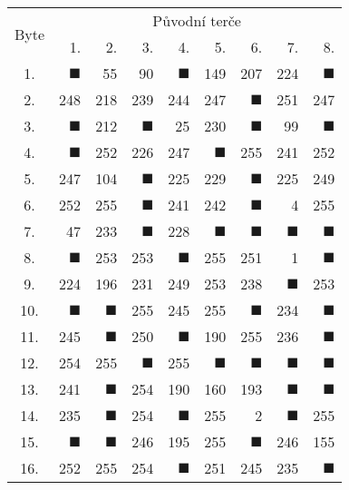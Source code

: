 \begin{tabular}{| c | r | r | r | r | r | r | r | r |}
	\hline
	\multirow{2}{*}{Byte} & \multicolumn{8}{c|}{Původní terče} \\
	\cline{2-9}
	~ & 1. & 2. & 3. & 4. & 5. & 6. & 7. & 8. \\
	\hline
	1.&$\blacksquare$&55&90&$\blacksquare$&149&207&224&$\blacksquare$\\
	\hline
	2.&248&218&239&244&247&$\blacksquare$&251&247\\
	\hline
	3.&$\blacksquare$&212&$\blacksquare$&25&230&$\blacksquare$&99&$\blacksquare$\\
	\hline
	4.&$\blacksquare$&252&226&247&$\blacksquare$&255&241&252\\
	\hline
	5.&247&104&$\blacksquare$&225&229&$\blacksquare$&225&249\\
	\hline
	6.&252&255&$\blacksquare$&241&242&$\blacksquare$&4&255\\
	\hline
	7.&47&233&$\blacksquare$&228&$\blacksquare$&$\blacksquare$&$\blacksquare$&$\blacksquare$\\
	\hline
	8.&$\blacksquare$&253&253&$\blacksquare$&255&251&1&$\blacksquare$\\
	\hline
	9.&224&196&231&249&253&238&$\blacksquare$&253\\
	\hline
	10.&$\blacksquare$&$\blacksquare$&255&245&255&$\blacksquare$&234&$\blacksquare$\\
	\hline
	11.&245&$\blacksquare$&250&$\blacksquare$&190&255&236&$\blacksquare$\\
	\hline
	12.&254&255&$\blacksquare$&255&$\blacksquare$&$\blacksquare$&$\blacksquare$&$\blacksquare$\\
	\hline
	13.&241&$\blacksquare$&254&190&160&193&$\blacksquare$&$\blacksquare$\\
	\hline
	14.&235&$\blacksquare$&254&$\blacksquare$&255&2&$\blacksquare$&255\\
	\hline
	15.&$\blacksquare$&$\blacksquare$&246&195&255&$\blacksquare$&246&155\\
	\hline
	16.&252&255&254&$\blacksquare$&251&245&235&$\blacksquare$\\
	\hline
\end{tabular}